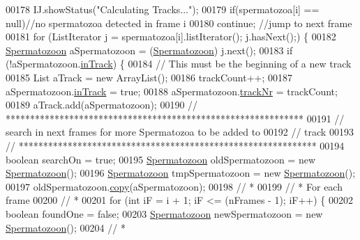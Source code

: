 \begin{DoxyCode}
00178       IJ.showStatus(\textcolor{stringliteral}{"Calculating Tracks..."});
00179       \textcolor{keywordflow}{if}(spermatozoa[i] == null)\textcolor{comment}{//no spermatozoa detected in frame i}
00180         \textcolor{keywordflow}{continue}; \textcolor{comment}{//jump to next frame}
00181       \textcolor{keywordflow}{for} (ListIterator j = spermatozoa[i].listIterator(); j.hasNext();) \{
00182         \hyperlink{classdata_1_1_spermatozoon}{Spermatozoon} aSpermatozoon = (\hyperlink{classdata_1_1_spermatozoon}{Spermatozoon}) j.next();
00183         \textcolor{keywordflow}{if} (!aSpermatozoon.\hyperlink{classdata_1_1_spermatozoon_a204be1963f7e7f07114c1d42360376be}{inTrack}) \{
00184           \textcolor{comment}{// This must be the beginning of a new track}
00185           List aTrack = \textcolor{keyword}{new} ArrayList();
00186           trackCount++;
00187           aSpermatozoon.\hyperlink{classdata_1_1_spermatozoon_a204be1963f7e7f07114c1d42360376be}{inTrack} = \textcolor{keyword}{true};
00188           aSpermatozoon.\hyperlink{classdata_1_1_spermatozoon_aee0b3af79335b49fe9d9b025cfcde703}{trackNr} = trackCount;
00189           aTrack.add(aSpermatozoon);
00190           \textcolor{comment}{// *************************************************************}
00191           \textcolor{comment}{// search in next frames for more Spermatozoa to be added to}
00192           \textcolor{comment}{// track}
00193           \textcolor{comment}{// *************************************************************}
00194           \textcolor{keywordtype}{boolean} searchOn = \textcolor{keyword}{true};
00195           \hyperlink{classdata_1_1_spermatozoon}{Spermatozoon} oldSpermatozoon = \textcolor{keyword}{new} \hyperlink{classdata_1_1_spermatozoon}{Spermatozoon}();
00196           \hyperlink{classdata_1_1_spermatozoon}{Spermatozoon} tmpSpermatozoon = \textcolor{keyword}{new} \hyperlink{classdata_1_1_spermatozoon}{Spermatozoon}();
00197           oldSpermatozoon.\hyperlink{classdata_1_1_spermatozoon_ac4622d389badba1a387ec1e139d35c8e}{copy}(aSpermatozoon);
00198           \textcolor{comment}{// *}
00199           \textcolor{comment}{// * For each frame}
00200           \textcolor{comment}{// *}
00201           \textcolor{keywordflow}{for} (\textcolor{keywordtype}{int} iF = i + 1; iF <= (nFrames - 1); iF++) \{
00202             \textcolor{keywordtype}{boolean} foundOne = \textcolor{keyword}{false};
00203             \hyperlink{classdata_1_1_spermatozoon}{Spermatozoon} newSpermatozoon = \textcolor{keyword}{new} \hyperlink{classdata_1_1_spermatozoon}{Spermatozoon}();
00204             \textcolor{comment}{// *}

\end{DoxyCode}
